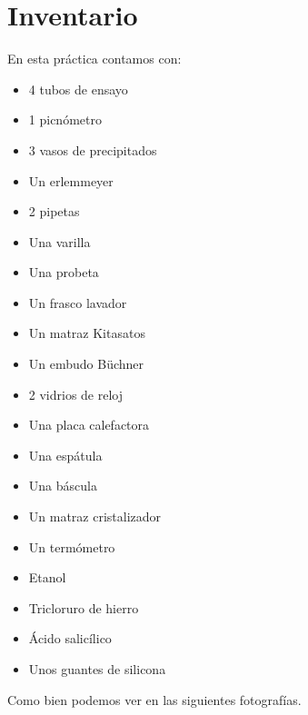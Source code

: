 \section{Inventario}  
\noindent En esta práctica contamos con:
\begin{multicols}{2}
    \begin{itemize}
        \item 4 tubos de ensayo 
        \item 1 picnómetro
        \item 3 vasos de precipitados
        \item Un erlemmeyer
        \item 2 pipetas
        \item Una varilla
        \item Una probeta
        \item Un frasco lavador
        \item Un matraz Kitasatos
        \item Un embudo Büchner
        \item 2 vidrios de reloj
        \item Una placa calefactora
        \item Una espátula
        \item Una báscula
        \item Un matraz cristalizador
        \item Un termómetro
        \item Etanol
        \item Tricloruro de hierro
        \item Ácido salicílico
        \item Unos guantes de silicona
    \end{itemize}
\end{multicols}

\vspace{0.8cm}
\noindent Como bien podemos ver en las siguientes fotografías.
\vspace{0.4cm}

